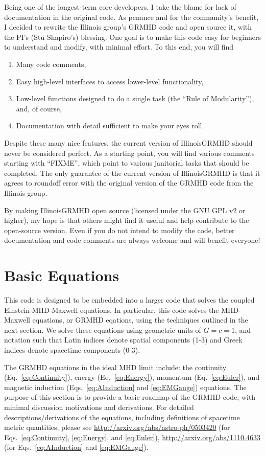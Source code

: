 \documentclass[showpacs,amsmath,amssymb,prd]{revtex4}
\begin{document}
Being one of the longest-term core developers, I take the blame
for lack of documentation in the original code. As penance
and for the community's benefit, I decided to rewrite the Illinois
group's GRMHD code and open source it, with the PI's (Stu Shapiro's)
blessing. One goal is to make this code easy for beginners to
understand and modify, with minimal effort. To this end, you will find 
\begin{enumerate}
\item Many code comments, 
\item Easy high-level interfaces to access lower-level functionality, 
\item Low-level functions designed to do a single task (the
\href{http://en.wikipedia.org/wiki/Unix_philosophy}{``Rule of
  Modularity''}), and, of course, 
\item Documentation with detail sufficient to make your eyes roll.
\end{enumerate}
Despite these many nice features, the current version of IllinoisGRMHD
should never be considered perfect. As a starting point, you will find
various comments starting with ``FIXME'', which point to various
janitorial tasks that should be completed. The only guarantee of the
current version of IllinoisGRMHD is that it agrees to roundoff error
with the original version of the GRMHD code from the Illinois group. 

By making IllinoisGRMHD open source (licensed under the GNU GPL v2 or
higher), my hope is that others might find it useful and help
contribute to the open-source version. Even if you do not intend to
modify the code, better documentation and code comments are always
welcome and will benefit everyone!

\section{Basic Equations}
This code is designed to be embedded into a larger code that solves
the coupled Einstein-MHD-Maxwell equations. In particular, this code
solves the MHD-Maxwell equations, or GRMHD eqations, using the
techniques outlined in the next section. We solve these equations
using geometric units of $G=c=1$, and notation such that Latin indices
denote spatial components (1-3) and Greek indices denote spacetime
components (0-3). 

The GRMHD equations in the ideal MHD limit include: the
continuity (Eq.~\ref{eq:Continuity}), energy (Eq.~\ref{eq:Energy}),
momentum (Eq.~\ref{eq:Euler}), and magnetic induction
(Eqs.~\ref{eq:AInduction} and \ref{eq:EMGauge}) equations. The purpose
of this section is to provide a basic roadmap of the GRMHD code, with
minimal discussion motivations and derivations. For detailed
descriptions/derivations of the equations, including definitions of
spacetime metric quantities, please see
\url{http://arxiv.org/abs/astro-ph/0503420} (for
Eqs.~\ref{eq:Continuity}, \ref{eq:Energy}, and \ref{eq:Euler}),
\url{http://arxiv.org/abs/1110.4633} (for Eqs.~\ref{eq:AInduction} and
\ref{eq:EMGauge}).
\end{document}
